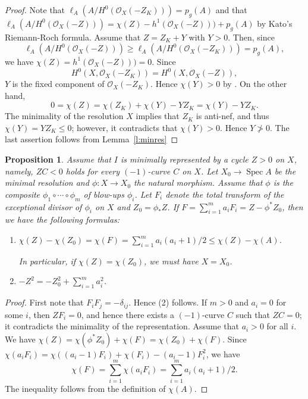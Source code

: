 \documentclass[12pt]{amsart}
\newtheorem{prop}[thm]{Proposition}
\theoremstyle{definition}
\theoremstyle{remark}
\numberwithin{equation}{section}
\newcommand{\lemref}[1]{Lemma~\ref{#1}}
\DeclareMathOperator{\spec}{Spec}
\newcommand{\cO}{\mathcal O}
\renewcommand{\:}{\colon}
\begin{document}
\begin{proof}
 Note that $\ell_A(A/H^0(\cO_X( -Z_K ) ) )=p_g(A)$ and that  
$\ell_A(A/H^0(\cO_X( -Z ) ) )=\chi(Z)- h^1(\cO_X( -Z ) ) ) + p_g(A)$ by Kato's Riemann-Roch formula.
Assume that $Z = Z_K +Y$ with $Y > 0$. Then, since 
\[
\ell_A(A/H^0(\cO_X( -Z ) ))  
\ge \ell_A(A/H^0(\cO_X( -Z_K ) ) )=p_g(A),
\] 
we have  $\chi(Z)= h^1(\cO_X( -Z ) ) )=0$.  
Since 
\[
H^0(X, \cO_X(-Z_K)) 
= H^0(X, \cO_X( -Z)),
\]
 $Y$ is the fixed component of $\cO_X(-Z_K)$. 
Hence $\chi(Y)>0$ by \cite{K}.
On the other hand,  
\[
0 = \chi(Z) = \chi(Z_K) + \chi(Y) - Y Z_K = \chi(Y) - Y Z_K. 
\]
The minimality of the resolution $X$ implies that $Z_K$ is anti-nef,
and thus  $\chi(Y) = Y Z_K \le 0$; however, it contradicts that $\chi(Y) > 0$. 
Hence $Y\not>0$. 
The last assertion follows from \lemref{l:minres}
\end{proof}


\begin{prop}\label{p:repMin}
Assume that $I$ is minimally represented by a cycle $Z>0$ on $X$, 
 namely, $ZC<0$ holds for every $(-1)$-curve $C$ on $X$. 
Let  $X_0 \to \spec A$ be the minimal resolution and $\phi: X\to X_0$ the natural morphism. 
Assume that $\phi$ is the composite $\phi_1\circ \cdots \circ \phi_m$ of blow-ups $\phi_i$.
Let $F_i$ denote the total transform of the exceptional divisor of $\phi_i$ on $X$ and $Z_0=\phi_*Z$.
If $F=\sum_{i=1}^m a_i F_i=Z - \phi^*Z_0$, then 
 we have the following formulas: 
\begin{enumerate}
\item 
 $\chi(Z)-\chi(Z_0) =\chi(F) = \displaystyle{\sum_{i=1}^m} a_i(a_i+1)/2 
 \le \chi(Z)-\chi(A)$. 
\par \vspace{1mm} \par \noindent 
In particular, if $\chi(Z) = \chi(Z_0)$, we must have $X = X_0$. 
\item $- Z^2 = - Z_0^2 + \displaystyle{\sum_{i=1}^m} a_i^2$. 
\end{enumerate}
\end{prop}

\begin{proof}
 First note that $F_iF_j=-\delta_{ij}$.
 Hence (2) follows.
If $m>0$ and $a_i=0$ for some $i$, then $ZF_i=0$, and hence 
there exists a $(-1)$-curve $C$ such that $ZC=0$; it contradicts the minimality of the representation.
Assume that $a_i>0$ for all $i$.
We have $\chi(Z)=\chi(\phi^*Z_0)+\chi(F)=\chi(Z_0)+\chi(F)$. 
Since 
$\chi(a_iF_i)=\chi((a_i-1)F_i)+\chi(F_i) -(a_i-1)F_i^2$, 
we have \[
\chi(F)=\sum_{i=1}^m \chi(a_i F_i)=\sum_{i=1}^m a_i(a_i+1)/2.
\]
The inequality follows from the definition of $\chi(A)$.
\end{proof}
\end{document}
